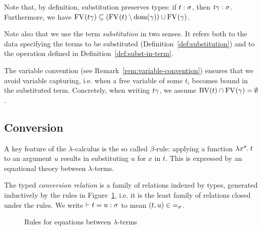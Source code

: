Note that, by definition, substitution preserves types: if $t : \sigma$, then $t \gamma : \sigma$. Furthermore, we have $\mathrm{FV}_{}(t \gamma) \subseteq (\mathrm{FV}_{}(t) \setminus \mathrm{dom}(\gamma)) \cup \mathrm{FV}_{}(\gamma)$.

Note also that we use the term \textit{substitution} in two senses. It refers both to the data specifying the terms to be substituted (Definition~\ref{def:substitution}) and to the operation defined in Definition~\ref{def:subst-in-term}.

\begin{rem}
The variable convention (see Remark~\ref{rem:variable-convention}) ensures that we avoid variable capturing, i.e. when a free variable of some $t_i$ becomes bound in the substituted term. Concretely, when writing $t \gamma$, we assume $\mathrm{BV}(t) \cap \mathrm{FV}_{}(\gamma) = \emptyset$.
\end{rem}

\subsection{Conversion}

A key feature of the $\lambda$-calculus is the so called $\beta$-rule: applying a function $\lambda x^{\sigma}\hspace{-1pt}.\;t$ to an argument $u$ results in substituting $u$ for $x$ in $t$. This is expressed by an equational theory between $\lambda$-terms.

\begin{defn}
The typed \emph{conversion relation} is a family of relations indexed by types, generated inductively by the rules in Figure~\ref{fig:stlc-equations}, i.e. it is the least family of relations closed under the rules. We write $\vdash t = u : \sigma$ to mean $(t, u) \in {=}_{\sigma}$.
\begin{figure}[ht]
\caption{Rules for equations between $\lambda$-terms}
\label{fig:stlc-equations}
\end{figure}
\end{defn}

